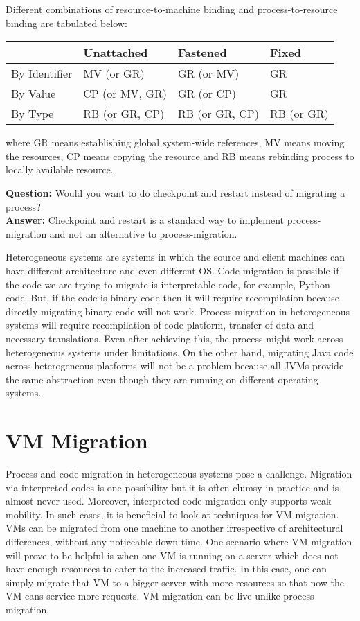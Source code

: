 \documentclass[twoside]{article}
\begin{document}
Different combinations of resource-to-machine binding and process-to-resource binding are tabulated below:

\begin{table}[htb]
  \centering
\begin{tabular}{ |p{3.5cm}|p{3.5cm}|p{3.5cm}|p{3.5cm}| }
\hline
 & \textbf{Unattached} & \textbf{Fastened} & \textbf{Fixed} \\
\hline
By Identifier & MV (or GR) & GR (or MV) & GR \\ \hline
By Value & CP (or MV, GR) & GR (or CP) & GR \\ \hline
By Type & RB (or GR, CP) & RB (or GR, CP) & RB (or GR) \\ \hline
\end{tabular}
\end{table}

where GR means establishing global system-wide references, MV means moving the resources, CP means copying the resource and RB means rebinding process to locally available resource.

\textbf{Question:} Would you want to do checkpoint and restart instead of migrating a process?
\\\textbf{Answer:} Checkpoint and restart is a standard way to implement process-migration and not an alternative to process-migration.

Heterogeneous systems are systems in which the source and client machines can have different architecture and even different OS. Code-migration is possible if the code we are trying to migrate is interpretable code, for example, Python code. But, if the code is binary code then it will require recompilation because directly migrating binary code will not work. Process migration in heterogeneous systems will require recompilation of code platform, transfer of data and necessary translations. Even after achieving this, the process might work across heterogeneous systems under limitations. On the other hand, migrating Java code across heterogeneous platforms will not be a problem because all JVMs provide the same abstraction even though they are running on different operating systems.  

\section{VM Migration}
Process and code migration in heterogeneous systems pose a challenge. Migration via interpreted codes is one possibility but it is often clumsy in practice and is almost never used. Moreover, interpreted code migration only supports weak mobility. In such cases, it is beneficial to look at techniques for VM migration. VMs can be migrated from one machine to another irrespective of architectural differences, without any noticeable down-time. One scenario where VM migration will prove to be helpful is when one VM is running on a server which does not have enough resources to cater to the increased traffic. In this case, one can simply migrate that VM to a bigger server with more resources so that now the VM cans service more requests. VM migration can be live unlike process migration.
\end{document}

